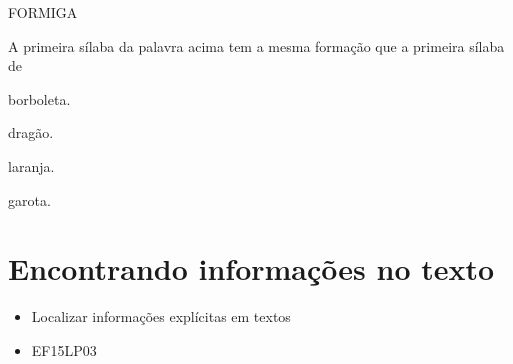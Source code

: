 FORMIGA

A primeira sílaba da palavra acima tem a mesma formação que a 
primeira sílaba de

\begin{escolha}
\item borboleta.

\item dragão.

\item laranja.

\item garota.
\end{escolha}


\chapter{Encontrando informações no texto}



\begin{itemize}
	\item Localizar informações explícitas em textos
\end{itemize}


\begin{itemize}
\item EF15LP03
\end{itemize}

